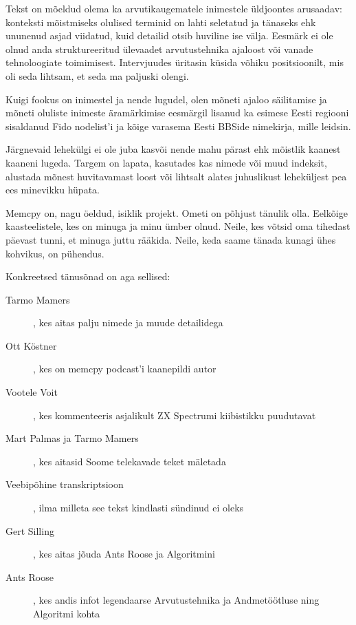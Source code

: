 Tekst on mõeldud olema ka arvutikaugematele inimestele üldjoontes arusaadav: 
konteksti mõistmiseks olulised terminid on lahti seletatud ja tänaseks ehk 
ununenud asjad viidatud, kuid detailid otsib huviline ise välja. Eesmärk ei ole 
olnud anda struktureeritud ülevaadet arvutustehnika ajaloost või vanade 
tehnoloogiate toimimisest. Intervjuudes üritasin küsida võhiku 
positsioonilt, mis oli seda lihtsam, et seda ma paljuski olengi.

Kuigi fookus on inimestel ja nende lugudel, olen mõneti ajaloo säilitamise ja 
mõneti oluliste inimeste äramärkimise eesmärgil lisanud ka esimese Eesti regiooni
sisaldanud Fido nodelist'i ja kõige varasema Eesti BBSide nimekirja, mille 
leidsin.

Järgnevaid lehekülgi ei ole juba kasvõi nende mahu pärast ehk mõistlik kaanest 
kaaneni lugeda. Targem on lapata, kasutades kas nimede või muud indeksit, 
alustada mõnest huvitavamast loost või lihtsalt alates juhuslikust leheküljest 
pea ees minevikku hüpata.

Memcpy on, nagu öeldud, isiklik projekt. Ometi on põhjust tänulik olla. 
Eelkõige kaasteelistele, kes on minuga ja minu ümber olnud. Neile, kes võtsid 
oma tihedast päevast tunni, et minuga juttu rääkida. Neile, keda saame tänada
kunagi ühes kohvikus, on pühendus.

Konkreetsed tänusõnad on aga sellised:

\begin{description}
	\item[Tarmo Mamers], kes aitas palju nimede ja muude detailidega
	\item[Ott Köstner], kes on memcpy podcast'i 
kaanepildi autor
	\item[Vootele Voit], kes kommenteeris 
asjalikult ZX Spectrumi kiibistikku puudutavat
	\item[Mart Palmas ja Tarmo Mamers], kes aitasid Soome telekavade teket mäletada 
	\item[Veebipõhine transkriptsioon], ilma milleta see tekst 
kindlasti sündinud ei oleks 
	\item[Gert Silling], kes aitas jõuda Ants Roose ja Algoritmini 
	\item[Ants Roose], kes andis infot legendaarse Arvutustehnika ja Andmetöötluse ning Algoritmi kohta 
\end{description}
